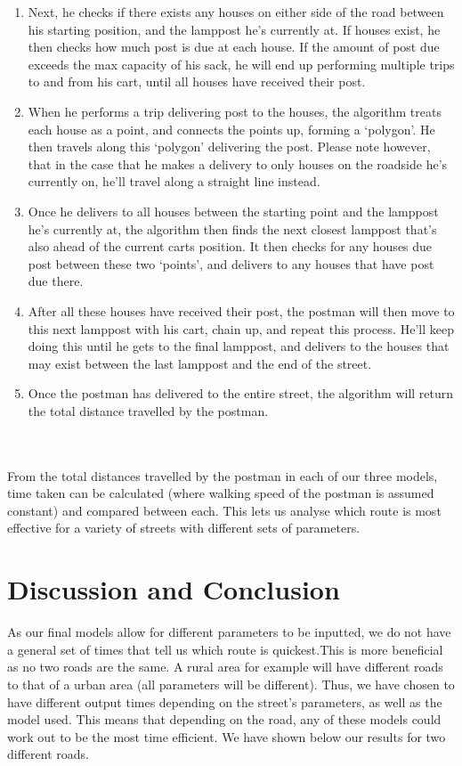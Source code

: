 \documentclass[14pt]{article}
\begin{document}
\begin{enumerate}
    \item Next, he checks if there exists any houses on either side of the road between his starting position, and the lamppost he’s currently at. If houses exist, he then checks how much post is due at each house. If the amount of post due exceeds the max capacity of his sack, he will end up performing multiple trips to and from his cart, until all houses have received their post.
    \item When he performs a trip delivering post to the houses, the algorithm treats each house as a point, and connects the points up, forming a ‘polygon’. He then travels along this ‘polygon’ delivering the post. Please note however, that in the case that he makes a delivery to only houses on the roadside he’s currently on, he’ll travel along a straight line instead.
    \item Once he delivers to all houses between the starting point and the lamppost he’s currently at, the algorithm then finds the next closest lamppost that’s also ahead of the current carts position. It then checks for any houses due post between these two ‘points’, and delivers to any houses that have post due there. 
    \item After all these houses have received their post, the postman will then move to this next lamppost with his cart, chain up, and repeat this process. He’ll keep doing this until he gets to the final lamppost, and delivers to the houses that may exist between the last lamppost and the end of the street.
    \item Once the postman has delivered to the entire street, the algorithm will return the total distance travelled by the postman.
\end{enumerate}
     \\
\\
From the total distances travelled by the postman in each of our three models, time taken can be calculated (where walking speed of the postman is assumed constant) and compared between each.  This lets us analyse which route is most effective for a variety of streets with different sets of parameters.


\section{Discussion and Conclusion}

As our final models allow for different parameters to be inputted, we do not have a general set of times that tell us which route is quickest.This is more beneficial as no two roads are the same. A rural area for example will have different roads to that of a urban area (all parameters will be different). Thus, we have chosen to have different output times depending on the street's parameters, as well as the model used. This means that depending on the road, any of these models could work out to be the most time efficient. We have shown below our results for two different roads.  
\end{document}
